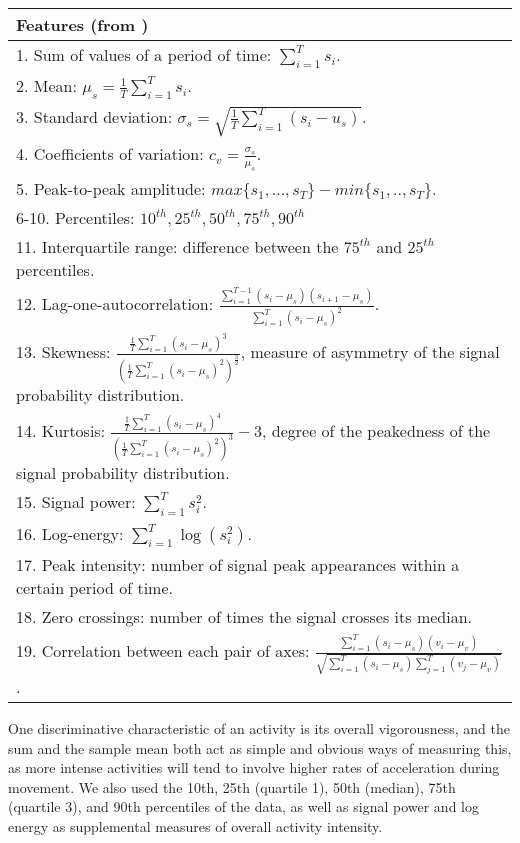 \begin{table}[h]
\centering
\begin{tabular}{|p{8cm}|}  \hline
Features (from \cite{zheng13})\\ \hline
1. Sum of values of a period of time: $\sum^T_{i=1} s_i$.\\
2. Mean: $\mu_s = \frac{1}{T} \sum^T_{i=1} s_i$.\\
3. Standard deviation: $\sigma_s = \sqrt{\frac{1}{T} \sum^T_{i=1} (s_i - u_s)}$.\\
4. Coefficients of variation: $c_v = \frac{\sigma_s}{\mu_s}$. \\
5. Peak-to-peak amplitude: $max \{s_1, ..., s_T\} - min \{s_1, .., s_T\}$.\\
6-10. Percentiles: $10^{th}, 25^{th}, 50^{th}, 75^{th}, 90^{th}$\\
11. Interquartile range: difference between the $75^{th}$ and $25^{th}$ percentiles.\\
12. Lag-one-autocorrelation: $\frac{\sum^{T-1}_{i=1} (s_i - \mu_s)(s_{i+1} - \mu_s)}{\sum^T_{i=1} (s_i - \mu_s)^2}$.\\
13. Skewness:
 $\frac{\frac{1}{T} \sum^T_{i=1} (s_i - \mu_s)^3}
{(\frac{1}{T} \sum^T_{i=1} (s_i - \mu_s)^2)^\frac{3}{2}}$,
 measure of asymmetry of the signal probability distribution.\\
14. Kurtosis:
 $\frac{\frac{1}{T} \sum^T_{i=1} (s_i - \mu_s)^4}
{(\frac{1}{T} \sum^T_{i=1} (s_i - \mu_s)^2)^3} - 3$,
 degree of the peakedness of the signal probability distribution.\\
15. Signal power: $\sum^T_{i=1} s_i^2$.\\
16. Log-energy: $\sum^T_{i=1} \log(s_i^2)$.\\
17. Peak intensity: number of signal peak appearances within a certain period of time.\\
18. Zero crossings: number of times the signal crosses its median.\\
19. Correlation between each pair of axes:
 $\frac{\sum^T_{i=1}(s_i-\mu_s)(v_i-\mu_v)}
{\sqrt{\sum^T_{i=1}(s_i-\mu_s) \sum^T_{j=1}(v_j-\mu_v)}}$.\\ \hline
\end{tabular}

One discriminative characteristic of an activity is its overall vigorousness,
and the sum and the sample mean both act as simple and obvious ways of measuring this,
as more intense activities will tend to involve
higher rates of acceleration during movement. We also used the 10th, 25th (quartile 1),
50th (median), 75th (quartile 3), and 90th percentiles of the data, as well as signal
power and log energy as supplemental measures of overall activity intensity.


\end{table}
